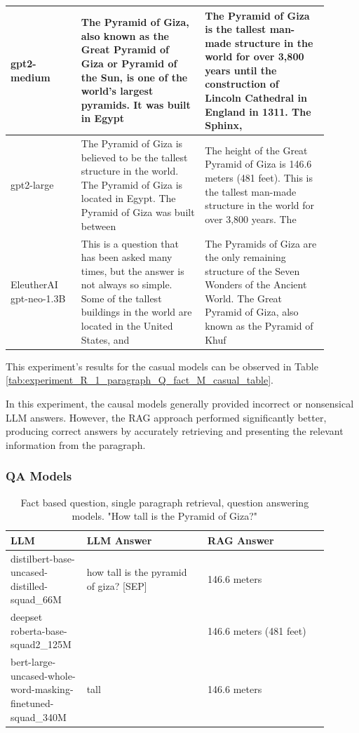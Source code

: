 \documentclass{wseas}
\begin{document}
\begin{table}[htbp]
\begin{tabular}{|p{0.20\linewidth}|p{0.35\linewidth}|p{0.35\linewidth}|}
    gpt2-medium & The Pyramid of Giza, also known as the Great Pyramid of Giza or Pyramid of the Sun, is one of the world's largest pyramids. It was built in Egypt & The Pyramid of Giza is the tallest man-made structure in the world for over 3,800 years until the construction of Lincoln Cathedral in England in 1311. The Sphinx, \\ \hline
    gpt2-large & The Pyramid of Giza is believed to be the tallest structure in the world. The Pyramid of Giza is located in Egypt. The Pyramid of Giza was built between & The height of the Great Pyramid of Giza is 146.6 meters (481 feet). This is the tallest man-made structure in the world for over 3,800 years. The \\ \hline
    EleutherAI gpt-neo-1.3B & This is a question that has been asked many times, but the answer is not always so simple. Some of the tallest buildings in the world are located in the United States, and & The Pyramids of Giza are the only remaining structure of the Seven Wonders of the Ancient World. The Great Pyramid of Giza, also known as the Pyramid of Khuf \\ \hline
  \end{tabular}
\end{table}

This experiment's results for the casual models can be observed in 
Table \ref{tab:experiment_R_1_paragraph_Q_fact_M_casual_table}.

In this experiment, the causal models generally provided incorrect or
nonsensical LLM answers. However, the RAG approach performed
significantly better, producing correct answers by accurately retrieving
and presenting the relevant information from the paragraph.

\subsubsection{QA Models}
\begin{table}[htbp]
  \centering
  \caption{Fact based question, single paragraph retrieval, question answering models. "How tall is the Pyramid of Giza?"} %
  \label{tab:experiment_R_1_paragraph_Q_fact_M_QaModels_table}
  \begin{tabular}{|p{0.2\linewidth}|p{0.35\linewidth}|p{0.35\linewidth}|}
    \hline
    \textbf{LLM} & \textbf{LLM Answer} & \textbf{RAG Answer} \\ \hline
    distilbert-base-uncased-distilled-squad\_66M & how tall is the pyramid of giza? {[}SEP{]} & 146.6 meters \\ \hline
    deepset roberta-base-squad2\_125M &  & 146.6 meters (481 feet) \\ \hline
    bert-large-uncased-whole-word-masking-finetuned-squad\_340M & tall & 146.6 meters \\ \hline
  \end{tabular}
\end{table}
\end{document}

